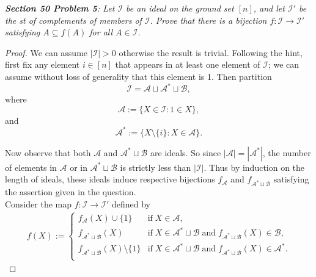 \documentclass{article}
\begin{document}
\it \textbf{Section 50 Problem 5}: Let $\mathcal{I}$ be an ideal on the
  ground set $[n]$, and let $\mathcal{I}'$ be the st of complements of
  members of $\mathcal{I}$. Prove that there is a bijection
  $f:\mathcal{I}\rightarrow\mathcal{I}'$ satisfying $A\subseteq f(A)$ for
  all $A\in\mathcal{I}$.

  \begin{proof}
    We can assume $|\mathcal{I}|>0$ otherwise the result is trivial.
    Following the hint, first fix any element $i\in[n]$ that appears in at
    least one element of $\mathcal{I}$; we can assume without loss of
    generality that this element is 1. Then partition
    \[\mathcal{I}=\mathcal{A}\sqcup\mathcal{A}^*\sqcup\mathcal{B},\]
    where
    \[\mathcal{A} :=\{X\in\mathcal{I}: 1\in X\},\]
    and
    \[\mathcal{A}^* :=\{X\setminus\{i\}: X\in\mathcal{A}\}.\]

    Now observe that both $\mathcal{A}$ and
    $\mathcal{A}^*\sqcup\mathcal{B}$ are ideals. So since
    $|\mathcal{A}|=|\mathcal{A}^*|$, the number of elements in
    $\mathcal{A}$ or in $\mathcal{A}^*\sqcup\mathcal{B}$ is strictly less
    than $|\mathcal{I}|$. Thus by induction on the length of ideals, these
    ideals induce respective bijections $f_{\mathcal{A}}$ and
    $f_{\mathcal{A}^*\sqcup\mathcal{B}}$ satisfying the assertion given in
    the question. \\


    Consider the map $f:\mathcal{I}\rightarrow\mathcal{I}'$ defined by
    \begin{align*}
      f(X) :=
      \begin{cases}
        f_{\mathcal{A}}(X)\cup\{1\} &\text{if}\; X\in \mathcal{A},\\
        f_{\mathcal{A}^*\sqcup\mathcal{B}}(X) &\text{if}\; X\in
          \mathcal{A}^*\sqcup\mathcal{B}\; \text{and}\;
          f_{\mathcal{A}^*\sqcup\mathcal{B}}(X) \in\mathcal{B},\\
        f_{\mathcal{A}^*\sqcup\mathcal{B}}(X)\setminus\{1\} &\text{if}\; X\in
          \mathcal{A}^*\sqcup\mathcal{B}\; \text{and}\;
          f_{\mathcal{A}^*\sqcup\mathcal{B}}(X) \in\mathcal{A}^*.\\
      \end{cases}
    \end{align*}
  \end{proof}
\end{document}
